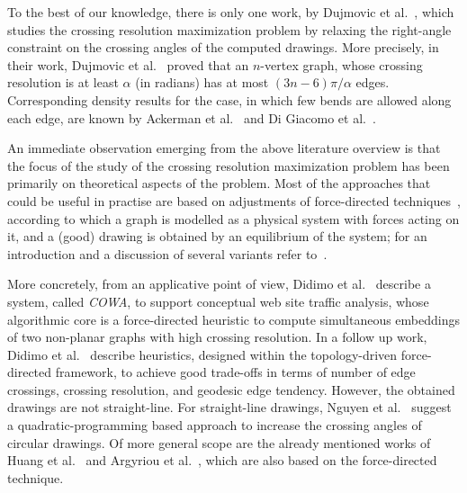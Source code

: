 \documentclass[runningheads]{llncs}
\begin{document}
To the best of our knowledge, there is only one work, by Dujmovic et al.~\cite{DBLP:journals/cjtcs/DujmovicGMW11}, which studies the crossing resolution maximization problem by relaxing the right-angle constraint on the crossing angles of the computed drawings. More precisely, in their work, Dujmovic et al.~\cite{DBLP:journals/cjtcs/DujmovicGMW11} proved that an $n$-vertex graph, whose crossing resolution is at least $\alpha$ (in radians) has at most $(3n-6)\pi/\alpha$ edges. Corresponding density results for the case, in which few bends are allowed along each edge, are known by Ackerman et al.~\cite{DBLP:journals/siamdm/AckermanFT12} and Di Giacomo et al.~\cite{DBLP:journals/mst/GiacomoDLM11}.  

An immediate observation emerging from the above literature overview is that the focus of the study of the crossing resolution maximization problem has been primarily on theoretical aspects of the problem. Most of the approaches that could be useful in practise are based on adjustments of force-directed techniques~\cite{DBLP:journals/congnum/Eades84}, according to which a graph is modelled as a physical system with forces acting on it, and a (good) drawing is obtained by an equilibrium of the system; for an introduction and a discussion of several variants refer to~\cite{DBLP:books/ph/BattistaETT99}. %

More concretely, from an applicative point of view, Didimo et al.~\cite{DBLP:conf/apvis/DidimoLR10} describe a system, called \emph{COWA}, to support conceptual web site traffic analysis, whose algorithmic core is a force-directed heuristic to compute simultaneous embeddings of two non-planar graphs with high crossing resolution. 
%
In a follow up work, Didimo et al.~\cite{DBLP:conf/gd/DidimoLR10} describe heuristics, designed within the topology-driven force-directed framework, to achieve good trade-offs in terms of number of edge crossings, crossing resolution, and geodesic edge tendency. 
%
However, the obtained drawings are not straight-line. For straight-line drawings, Nguyen et al.~\cite{DBLP:conf/gd/NguyenEHH10} suggest a quadratic-programming based approach to increase the crossing angles of circular drawings. 
%
Of more general scope are the already mentioned works of Huang et al.~\cite{DBLP:journals/vlc/HuangEHL13} and Argyriou et al.~\cite{DBLP:journals/cj/ArgyriouBS13}, which are also based on the force-directed technique. 
\end{document}
